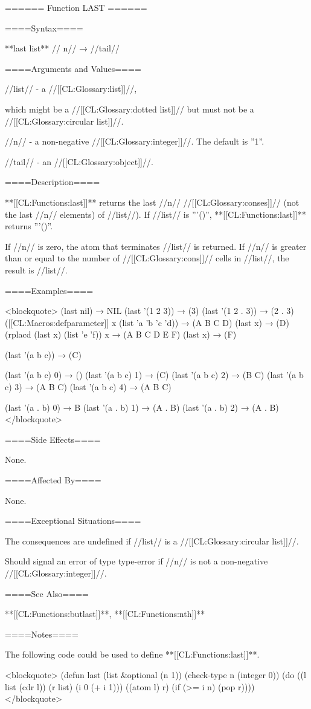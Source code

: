 ====== Function LAST ======

====Syntax====

**last {list** //\opt} n// → //tail//

====Arguments and Values====

//list// - a //[[CL:Glossary:list]]//,

which might be a //[[CL:Glossary:dotted list]]// but must not be a //[[CL:Glossary:circular list]]//.

//n// - a non-negative //[[CL:Glossary:integer]]//. The default is ''1''.

//tail// - an //[[CL:Glossary:object]]//.

====Description====

**[[CL:Functions:last]]** returns the last //n// //[[CL:Glossary:conses]]// (not the last //n// elements) of //list//). If //list// is '''()'', **[[CL:Functions:last]]** returns '''()''.

If //n// is zero, the atom that terminates //list// is returned. If //n// is greater than or equal to the number of //[[CL:Glossary:cons]]// cells in //list//, the result is //list//.

====Examples====

<blockquote> (last nil) → NIL (last '(1 2 3)) → (3) (last '(1 2 . 3)) → (2 . 3) ([[CL:Macros:defparameter]] x (list 'a 'b 'c 'd)) → (A B C D) (last x) → (D) (rplacd (last x) (list 'e 'f)) x → (A B C D E F) (last x) → (F)

(last '(a b c)) → (C)

(last '(a b c) 0) → () (last '(a b c) 1) → (C) (last '(a b c) 2) → (B C) (last '(a b c) 3) → (A B C) (last '(a b c) 4) → (A B C)

(last '(a . b) 0) → B (last '(a . b) 1) → (A . B) (last '(a . b) 2) → (A . B) </blockquote>

====Side Effects====

None.

====Affected By====

None.

====Exceptional Situations====

The consequences are undefined if //list// is a //[[CL:Glossary:circular list]]//.

Should signal an error of type type-error if //n// is not a non-negative //[[CL:Glossary:integer]]//.

====See Also====

**[[CL:Functions:butlast]]**, **[[CL:Functions:nth]]**

====Notes====

The following code could be used to define **[[CL:Functions:last]]**.

<blockquote> (defun last (list &optional (n 1)) (check-type n (integer 0)) (do ((l list (cdr l)) (r list) (i 0 (+ i 1))) ((atom l) r) (if (>= i n) (pop r)))) </blockquote>

     
